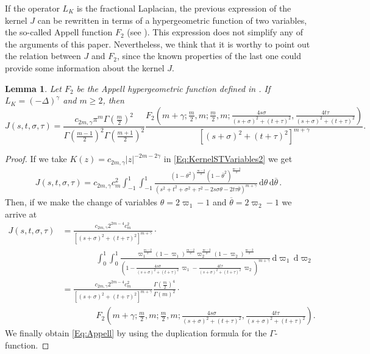 \documentclass[12pt,reqno]{amsart}
\newtheorem{lemma}[theorem]{Lemma}
\theoremstyle{definition}
\theoremstyle{remark}
\newcommand{\s}{\gamma}
\renewcommand{\d}{\,\mathrm{d}} %
\numberwithin{equation}{section}
\begin{document}
If the operator $L_K$ is the fractional Laplacian, the previous expression of the kernel $J$ can be rewritten in terms of a hypergeometric function of two variables, the so-called Appell function $F_2$ (see \cite{Appell}). This expression does not simplify any of the arguments of this paper. Nevertheless, we think that it is worthy to point out the relation between $J$ and $F_2$, since the known properties of the last one could provide some information about the kernel $J$.

\begin{lemma}
	\label{Lemma:Appell} Let $F_2$ be the Appell hypergeometric function defined in \cite{Appell}. If $L_K = (-\Delta)^\s$ and $m\geq 2$, then
	\begin{equation}
	\label{Eq:Appell}
	J(s,t,\sigma,\tau) = \frac{c_{2m,\s}\pi^m\Gamma\left(\frac{m}{2}\right)^2}{\Gamma\left(\frac{m-1}{2}\right)^2\Gamma\left(\frac{m+1}{2}\right)^2} \frac{F_2\left( m+\s;\frac{m}{2},m;\frac{m}{2},m;\frac{4s\sigma}{(s+\sigma)^2+(t+\tau)^2},\frac{4t\tau}{(s+\sigma)^2+(t+\tau)^2} \right)}{[(s+\sigma)^2+(t+\tau)^2]^{m+\s}}.
	\end{equation}
\end{lemma}



\begin{proof}
	If we take $K(z) = c_{2m,\s}|z|^{-2m-2\s}$ in \eqref{Eq:KernelSTVariables2} we get
	\begin{align*}
	J(s,t,\sigma, \tau) = c_{2m,\s} c_m ^2  \int_{-1}^1  \int_{-1}^1  \frac{(1-\theta^2)^{\frac{m-2}{2}} (1-\overline{\theta}^2)^{\frac{m-2}{2}}}{(s^2 + t^2 + \sigma^2 + \tau^2 -2 s \sigma \theta -2 t \tau \overline{\theta})^{m+\s}} \d \theta \d \overline{\theta}\,.
	\end{align*}
	Then, if we make the change of variables $\theta = 2\varpi_1-1$ and $\overline{\theta}=2\varpi_2-1$
	we arrive at
	\begin{align*}
	J(s,t,\sigma, \tau) &= \frac{ c_{2m,\s} 2^{2m-4} c_m^2}{[(s+\sigma)^2+(t+\tau)^2]^{m+\s}} \cdot \\
	& \quad \quad \quad \quad  \int_0^1 \int_0^1
	\frac{ \varpi_1^\frac{m-2}{2} (1-\varpi_1)^\frac{m-2}{2} \varpi_2^\frac{m-2}{2}
		(1-\varpi_2)^\frac{m-2}{2}}{\left(1-\frac{4s\sigma}{(s+\sigma)^2+(t+\tau)^2}\,\varpi_1-\frac{4t\tau}{(s+\sigma)^2+(t+\tau)^2}\,\varpi_2
		\right)^{m+\s}} \d \varpi_1 \d \varpi_2 \\
	&= \frac{ c_{2m,\s} 2^{2m-4} c_m^2}{[(s+\sigma)^2+(t+\tau)^2]^{m+\s}} \frac{\Gamma\left(\frac{m}{2} \right)^4}{\Gamma(m)^2} \cdot \\
	& \quad \quad \quad \quad F_2\left( m+\s;\frac{m}{2},m;\frac{m}{2},m;\frac{4s\sigma}{(s+\sigma)^2+(t+\tau)^2},\frac{4t\tau}{(s+\sigma)^2+(t+\tau)^2} \right).
	\end{align*}
	We finally obtain \eqref{Eq:Appell} by using the duplication formula for the $\Gamma$-function.
\end{proof}
\end{document}
